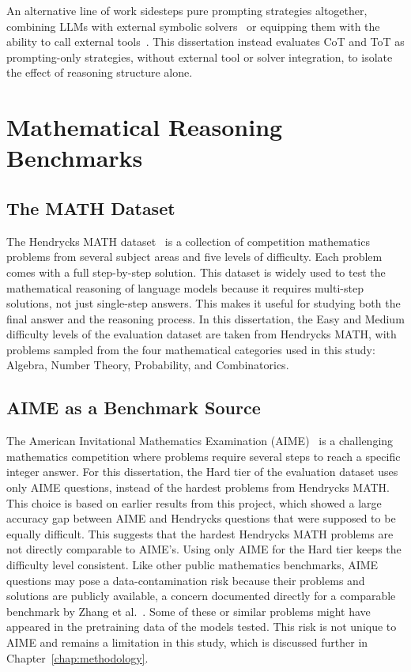 An alternative line of work sidesteps pure prompting strategies
altogether, combining LLMs with external symbolic
solvers~\cite{heyueya2023symbolic} or equipping them with the ability to
call external tools~\cite{schick2023toolformer}. This dissertation
instead evaluates CoT and ToT as prompting-only strategies, without
external tool or solver integration, to isolate the effect of reasoning
structure alone.

\section{Mathematical Reasoning Benchmarks}
\subsection{The MATH Dataset}

The Hendrycks MATH dataset~\cite{hendrycks2021measuring} is a collection
of competition mathematics problems from several subject areas and five
levels of difficulty. Each problem comes with a full step-by-step
solution. This dataset is widely used to test the mathematical reasoning
of language models because it requires multi-step solutions, not just
single-step answers. This makes it useful for studying both the final
answer and the reasoning process. In this dissertation, the Easy and
Medium difficulty levels of the evaluation dataset are taken from
Hendrycks MATH, with problems sampled from the four mathematical
categories used in this study: Algebra, Number Theory, Probability, and
Combinatorics.

\subsection{AIME as a Benchmark Source}

The American Invitational Mathematics Examination (AIME)~\cite{maa_aime}
is a challenging mathematics competition where problems require several
steps to reach a specific integer answer. For this dissertation, the Hard
tier of the evaluation dataset uses only AIME questions, instead of the
hardest problems from Hendrycks MATH. This choice is based on earlier
results from this project, which showed a large accuracy gap between AIME
and Hendrycks questions that were supposed to be equally difficult. This
suggests that the hardest Hendrycks MATH problems are not directly
comparable to AIME's. Using only AIME for the Hard tier keeps the
difficulty level consistent. Like other public mathematics benchmarks,
AIME questions may pose a data-contamination risk because their problems
and solutions are publicly available, a concern documented directly for
a comparable benchmark by Zhang et al.~\cite{zhang2024gsm1k}. Some of
these or similar problems
might have appeared in the pretraining data of the models tested. This
risk is not unique to AIME and remains a limitation in this study, which
is discussed further in Chapter~\ref{chap:methodology}.


